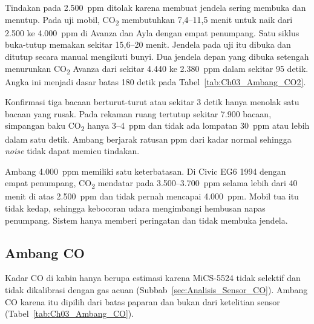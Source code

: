     Tindakan pada 2.500~ppm ditolak karena membuat jendela sering membuka dan menutup. Pada uji mobil, CO\textsubscript{2} membutuhkan 7,4--11,5 menit untuk naik dari 2.500 ke 4.000~ppm di Avanza dan Ayla dengan empat penumpang. Satu siklus buka-tutup memakan sekitar 15,6--20 menit. Jendela pada uji itu dibuka dan ditutup secara manual mengikuti bunyi. Dua jendela depan yang dibuka setengah menurunkan CO\textsubscript{2} Avanza dari sekitar 4.440 ke 2.380~ppm dalam sekitar 95 detik. Angka ini menjadi dasar batas 180 detik pada Tabel~\ref{tab:Ch03_Ambang_CO2}.

    Konfirmasi tiga bacaan berturut-turut atau sekitar 3 detik hanya menolak satu bacaan yang rusak. Pada rekaman ruang tertutup sekitar 7.900 bacaan, simpangan baku CO\textsubscript{2} hanya 3--4~ppm dan tidak ada lompatan 30~ppm atau lebih dalam satu detik. Ambang berjarak ratusan ppm dari kadar normal sehingga \textit{noise} tidak dapat memicu tindakan.

    Ambang 4.000~ppm memiliki satu keterbatasan. Di Civic EG6 1994 dengan empat penumpang, CO\textsubscript{2} mendatar pada 3.500--3.700~ppm selama lebih dari 40 menit di atas 2.500~ppm dan tidak pernah mencapai 4.000~ppm. Mobil tua itu tidak kedap, sehingga kebocoran udara mengimbangi hembusan napas penumpang. Sistem hanya memberi peringatan dan tidak membuka jendela.


    \subsection{Ambang CO}
    \label{sec:Ambang_CO}

    Kadar CO di kabin hanya berupa estimasi karena MiCS-5524 tidak selektif dan tidak dikalibrasi dengan gas acuan (Subbab~\ref{sec:Analisis_Sensor_CO}). Ambang CO karena itu dipilih dari batas paparan dan bukan dari ketelitian sensor (Tabel~\ref{tab:Ch03_Ambang_CO}).

